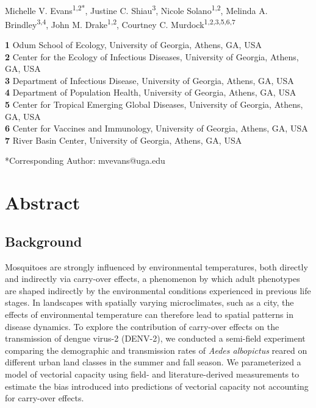 \documentclass[12pt]{article}
\begin{document}

{\Large
\textbf{}}
\\
Michelle V. Evans\textsuperscript{1,2*},
Justine C. Shiau\textsuperscript{3},
Nicole Solano\textsuperscript{1,2},
Melinda A. Brindley\textsuperscript{3,4},
John M. Drake\textsuperscript{1,2},
Courtney C. Murdock\textsuperscript{1,2,3,5,6,7}
\bigskip

\noindent
\textbf{1} Odum School of Ecology, University of Georgia, Athens, GA, USA
\\
\textbf{2} Center for the Ecology of Infectious Diseases, University of Georgia, Athens, GA, USA
\\
\textbf{3} Department of Infectious Disease, University of Georgia, Athens, GA, USA
\\
\textbf{4} Department of Population Health, University of Georgia, Athens, GA, USA
\\
\textbf{5} Center for Tropical Emerging Global Diseases, University of Georgia, Athens, GA, USA
\\
\textbf{6} Center for Vaccines and Immunology, University of Georgia, Athens, GA, USA
\\
\textbf{7} River Basin Center, University of Georgia, Athens, GA, USA
\\
\smallskip

\noindent
*Corresponding Author: mvevans@uga.edu

\newpage

\section*{Abstract}
\subsection*{Background}
Mosquitoes are strongly influenced by environmental temperatures, both directly and indirectly via carry-over effects, a phenomenon by which adult phenotypes are shaped indirectly by the environmental conditions experienced in previous life stages. In landscapes with spatially varying microclimates, such as a city, the effects of environmental temperature can therefore lead to spatial patterns in disease dynamics. To explore the contribution of carry-over effects on the transmission of dengue virus-2 (DENV-2), we conducted a semi-field experiment comparing the demographic and transmission rates of \textit{Aedes albopictus} reared on different urban land classes in the summer and fall season. We parameterized a model of vectorial capacity using field- and literature-derived measurements to estimate the bias introduced into predictions of vectorial capacity not accounting for carry-over effects.
\end{document}
